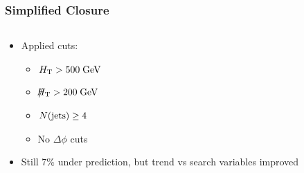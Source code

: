 \documentclass{beamer}
\begin{document}
\begin{frame}
 \frametitle{Simplified Closure}
 \begin{columns}
  \begin{column}{0.33\textwidth}
  \begin{itemize}
   \item Applied cuts:
   \begin{itemize}
    \item $H_{\text{T}}>500\;\text{Ge}\kern-0.06667em\text{V}$
    \item $\slash\mkern-12mu{H}_{\text{T}}>200\;\text{Ge}\kern-0.06667em\text{V}$
    \item $N(\text{jets})\ge4$
    \item No $\Delta\phi$ cuts
   \end{itemize}
   \item Still 7\% under prediction, but trend vs search variables improved
  \end{itemize}
  \end{column}
  \begin{column}{0.33\textwidth}

\end{column}
\end{columns}
\end{frame}
\end{document}
